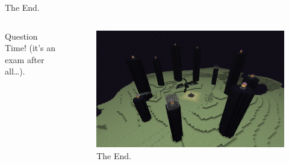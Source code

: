 \documentclass[english]{beamer}
\begin{document}
\begin{frame}{The End.}

  \begin{columns}
    
    \begin{column}{0.4\textwidth}
      Question Time! (it's an exam after all\dots).
    \end{column}
    
    \begin{column}{0.6\textwidth}
      \begin{figure}
        \centering
            \includegraphics[width=1.0\textwidth]{images/The_End.jpg}
            \caption{The End.}
        \end{figure}
    \end{column}

  \end{columns}

\end{frame}
\end{document}
